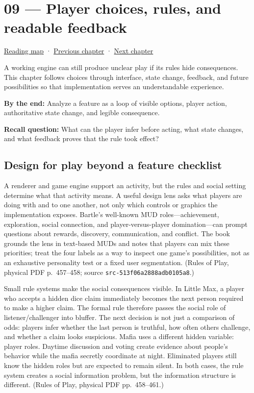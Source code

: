\hypertarget{05-engine-i-ch009}{}
\chapter{09 --- Player choices, rules, and readable feedback}\label{05-engine-i-ch009-player-choices-rules-and-readable-feedback}

\hyperref[volume-reading-map]{Reading map} · \hyperref[05-engine-i-ch008]{Previous chapter} · \hyperref[05-engine-i-ch010]{Next chapter}

A working engine can still produce unclear play if its rules hide consequences. This chapter follows choices through interface, state change, feedback, and future possibilities so that implementation serves an understandable experience.

\textbf{By the end:} Analyze a feature as a loop of visible options, player action, authoritative state change, and legible consequence.

\textbf{Recall question:} What can the player infer before acting, what state changes, and what feedback proves that the rule took effect?

\section{Design for play beyond a feature checklist}\label{05-engine-i-ch009-design-for-play-beyond-a-feature-checklist}

A renderer and game engine support an activity, but the rules and social setting determine what that activity means. A useful design lens asks what players are doing with and to one another, not only which controls or graphics the implementation exposes. Bartle's well-known MUD roles---achievement, exploration, social connection, and player-versus-player domination---can prompt questions about rewards, discovery, communication, and conflict. The book grounds the lens in text-based MUDs and notes that players can mix these priorities; treat the four labels as a way to inspect one game's possibilities, not as an exhaustive personality test or a fixed user segmentation. (Rules of Play, physical PDF p.~457--458; source \texttt{src-513f06a2888adb0105a8}.)

Small rule systems make the social consequences visible. In Little Max, a player who accepts a hidden dice claim immediately becomes the next person required to make a higher claim. The formal rule therefore passes the social role of listener/challenger into bluffer. The next decision is not just a comparison of odds: players infer whether the last person is truthful, how often others challenge, and whether a claim looks suspicious. Mafia uses a different hidden variable: player roles. Daytime discussion and voting create evidence about people's behavior while the mafia secretly coordinate at night. Eliminated players still know the hidden roles but are expected to remain silent. In both cases, the rule system creates a social information problem, but the information structure is different. (Rules of Play, physical PDF pp.~458--461.)

